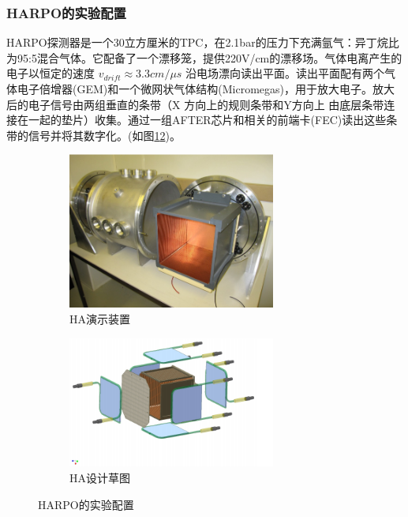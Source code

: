 \subsubsection{HARPO的实验配置}
HARPO探测器是一个30立方厘米的TPC，在2.1bar的压力下充满氩气：异丁烷比为95:5混合气体。它配备了一个漂移笼，提供220V/cm的漂移场。气体电离产生的电子以恒定的速度
$v_{drift}\approx 3.3cm/μs$ 
沿电场漂向读出平面。读出平面配有两个气体电子倍增器(GEM)和一个微网状气体结构(Micromegas)，用于放大电子。放大后的电子信号由两组垂直的条带（X 方向上的规则条带和Y方向上
由底层条带连接在一起的垫片）收集。通过一组AFTER芯片和相关的前端卡(FEC)读出这些条带的信号并将其数字化。(如图\ref{fig:sub1}\ref{fig:sub2})。
	\begin{figure}[htbp]
		\centering
		\begin{subfigure}[b]{0.45\textwidth}
			\includegraphics[width=0.75\textwidth]{figures/HA演示装置.png}
			\caption{HA演示装置}
			\label{fig:sub1}
		\end{subfigure}
		\hspace{0.01\textwidth} %
		\begin{subfigure}[b]{0.45\textwidth}
			\includegraphics[width=0.75\textwidth]{figures/HA设计草图.png}
			\caption{HA设计草图}
			\label{fig:sub2}
		\end{subfigure}
		\caption{HARPO的实验配置}
		\label{fig:figures}
	\end{figure}

